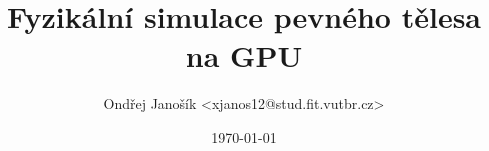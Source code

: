 \documentclass[a4paper, 12pt]{article}
\title{Fyzikální simulace pevného tělesa na GPU}
\author{Ondřej Janošík <xjanos12@stud.fit.vutbr.cz>}
\date{\today}
\begin{document}
\maketitle



\begin{flushleft}
  
\end{flushleft}

\end{document}
